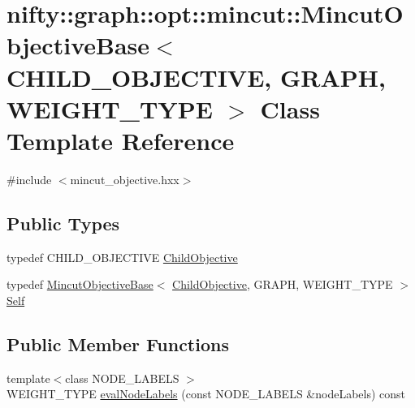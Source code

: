 \hypertarget{classnifty_1_1graph_1_1opt_1_1mincut_1_1MincutObjectiveBase}{}\section{nifty\+:\+:graph\+:\+:opt\+:\+:mincut\+:\+:Mincut\+Objective\+Base$<$ C\+H\+I\+L\+D\+\_\+\+O\+B\+J\+E\+C\+T\+I\+VE, G\+R\+A\+PH, W\+E\+I\+G\+H\+T\+\_\+\+T\+Y\+PE $>$ Class Template Reference}
\label{classnifty_1_1graph_1_1opt_1_1mincut_1_1MincutObjectiveBase}


{\ttfamily \#include $<$mincut\+\_\+objective.\+hxx$>$}

\subsection*{Public Types}
\begin{DoxyCompactItemize}
\item 
typedef C\+H\+I\+L\+D\+\_\+\+O\+B\+J\+E\+C\+T\+I\+VE \hyperlink{classnifty_1_1graph_1_1opt_1_1mincut_1_1MincutObjectiveBase_a0a0611141f24bfbf07488bea9e216ecd}{Child\+Objective}
\item 
typedef \hyperlink{classnifty_1_1graph_1_1opt_1_1mincut_1_1MincutObjectiveBase}{Mincut\+Objective\+Base}$<$ \hyperlink{classnifty_1_1graph_1_1opt_1_1mincut_1_1MincutObjectiveBase_a0a0611141f24bfbf07488bea9e216ecd}{Child\+Objective}, G\+R\+A\+PH, W\+E\+I\+G\+H\+T\+\_\+\+T\+Y\+PE $>$ \hyperlink{classnifty_1_1graph_1_1opt_1_1mincut_1_1MincutObjectiveBase_a4d4cc2b24623941303a0de70a0e47ec8}{Self}
\end{DoxyCompactItemize}
\subsection*{Public Member Functions}
\begin{DoxyCompactItemize}
\item 
{\footnotesize template$<$class N\+O\+D\+E\+\_\+\+L\+A\+B\+E\+LS $>$ }\\W\+E\+I\+G\+H\+T\+\_\+\+T\+Y\+PE \hyperlink{classnifty_1_1graph_1_1opt_1_1mincut_1_1MincutObjectiveBase_a7ff6fb377b6dd51f77aafd8a37eacebe}{eval\+Node\+Labels} (const N\+O\+D\+E\+\_\+\+L\+A\+B\+E\+LS \&node\+Labels) const
\end{DoxyCompactItemize}


